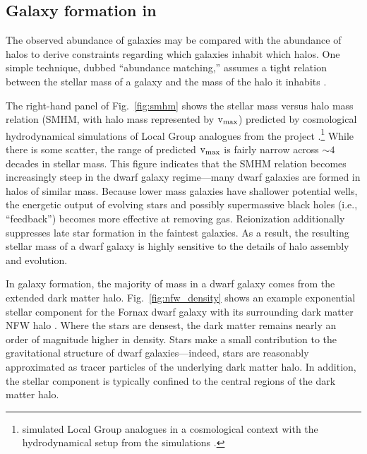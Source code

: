 \subsection{\texorpdfstring{Galaxy formation in
\LCDM{}}{Galaxy formation in }}\label{sec:galaxy_formation}

The observed abundance of galaxies may be compared with the abundance of
\LCDM{} halos to derive constraints regarding which galaxies inhabit
which halos. One simple technique, dubbed ``abundance matching,''
assumes a tight relation between the stellar mass of a galaxy and the
mass of the halo it inhabits
\citep{li+white2009, moster+naab+white2013}.

The right-hand panel of Fig.~\ref{fig:smhm} shows the stellar mass
versus halo mass relation (SMHM, with halo mass represented by
\({\rm v}_{\rm max}\)) predicted by \LCDM{} cosmological hydrodynamical simulations
of Local Group analogues from the \apostle{} project
\citep{sawala+2016}.\footnote{\apostle{} simulated Local Group analogues
  in a \LCDM{} cosmological context with the hydrodynamical setup from
  the \eagle{} simulations \citep{crain+2015, schaye+2015}.} While there
is some scatter, the range of predicted \({\rm v}_{\rm max}\) is fairly narrow
across \(\sim 4\) decades in stellar mass. This figure indicates that
the SMHM relation becomes increasingly steep in the dwarf galaxy
regime---many dwarf galaxies are formed in halos of similar mass.
Because lower mass galaxies have shallower potential wells, the
energetic output of evolving stars and possibly supermassive black holes
(i.e., ``feedback'') becomes more effective at removing gas.
Reionization additionally suppresses late star formation in the faintest
galaxies. As a result, the resulting stellar mass of a dwarf galaxy is
highly sensitive to the details of halo assembly and evolution.

In \LCDM{} galaxy formation, the majority of mass in a dwarf galaxy
comes from the extended dark matter halo. Fig.~\ref{fig:nfw_density}
shows an example exponential stellar component for the Fornax dwarf
galaxy with its surrounding dark matter NFW halo \citep[with parameters
matching the][ and \citet{fattahi+2018} relations]{ludlow+2016}. Where
the stars are densest, the dark matter remains nearly an order of
magnitude higher in density. Stars make a small contribution to the
gravitational structure of dwarf galaxies---indeed, stars are reasonably
approximated as tracer particles of the underlying dark matter halo. In
addition, the stellar component is typically confined to the central
regions of the dark matter halo.

